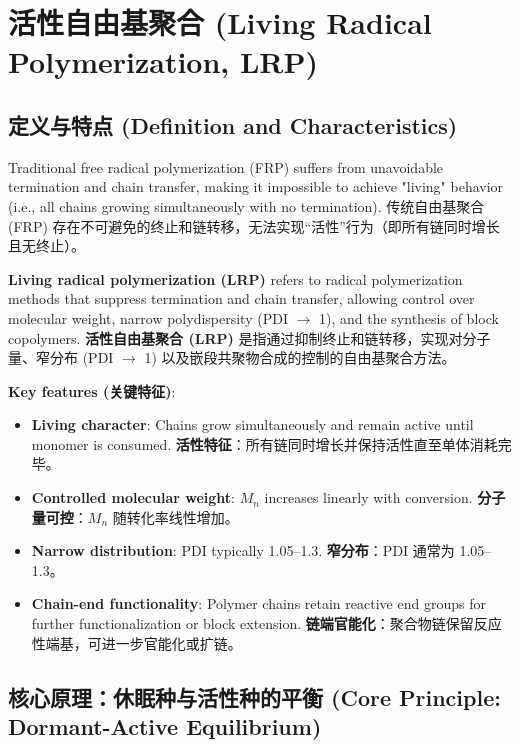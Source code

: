 \documentclass[12pt,a4paper]{ctexart}
\begin{document}
\section{活性自由基聚合 (Living Radical Polymerization, LRP)}

\subsection{定义与特点 (Definition and Characteristics)}

Traditional free radical polymerization (FRP) suffers from unavoidable termination and chain transfer, making it impossible to achieve "living" behavior (i.e., all chains growing simultaneously with no termination).  
传统自由基聚合 (FRP) 存在不可避免的终止和链转移，无法实现“活性”行为（即所有链同时增长且无终止）。

\textbf{Living radical polymerization (LRP)} refers to radical polymerization methods that suppress termination and chain transfer, allowing control over molecular weight, narrow polydispersity (PDI $\rightarrow$ 1), and the synthesis of block copolymers.  
\textbf{活性自由基聚合 (LRP)} 是指通过抑制终止和链转移，实现对分子量、窄分布 (PDI $\rightarrow$ 1) 以及嵌段共聚物合成的控制的自由基聚合方法。

\textbf{Key features (关键特征)}:
\begin{itemize}
    \item \textbf{Living character}: Chains grow simultaneously and remain active until monomer is consumed.  
      \textbf{活性特征}：所有链同时增长并保持活性直至单体消耗完毕。
    \item \textbf{Controlled molecular weight}: $M_n$ increases linearly with conversion.  
      \textbf{分子量可控}：$M_n$ 随转化率线性增加。
    \item \textbf{Narrow distribution}: PDI typically 1.05–1.3.  
      \textbf{窄分布}：PDI 通常为 1.05–1.3。
    \item \textbf{Chain-end functionality}: Polymer chains retain reactive end groups for further functionalization or block extension.  
      \textbf{链端官能化}：聚合物链保留反应性端基，可进一步官能化或扩链。
\end{itemize}

\subsection{核心原理：休眠种与活性种的平衡 (Core Principle: Dormant-Active Equilibrium)}
\end{document}

